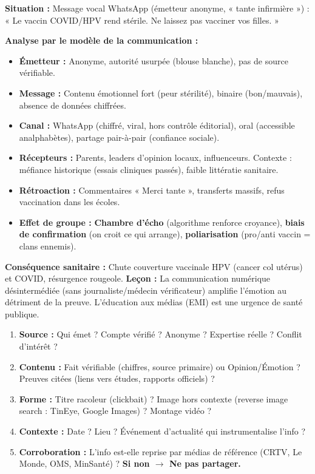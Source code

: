 \documentclass[11pt]{article}
\begin{document}
\begin{exemplebox}
\textbf{Situation :} Message vocal WhatsApp (émetteur anonyme, « tante infirmière ») : « Le vaccin COVID/HPV rend stérile. Ne laissez pas vacciner vos filles. »\par
\textbf{Analyse par le modèle de la communication :}
\begin{itemize}
\item \textbf{Émetteur :} Anonyme, autorité usurpée (blouse blanche), pas de source vérifiable.
\item \textbf{Message :} Contenu émotionnel fort (peur stérilité), binaire (bon/mauvais), absence de données chiffrées.
\item \textbf{Canal :} WhatsApp (chiffré, viral, hors contrôle éditorial), oral (accessible analphabètes), partage pair-à-pair (confiance sociale).
\item \textbf{Récepteurs :} Parents, leaders d'opinion locaux, influenceurs. Contexte : méfiance historique (essais cliniques passés), faible littératie sanitaire.
\item \textbf{Rétroaction :} Commentaires « Merci tante », transferts massifs, refus vaccination dans les écoles.
\item \textbf{Effet de groupe :} \textbf{Chambre d'écho} (algorithme renforce croyance), \textbf{biais de confirmation} (on croit ce qui arrange), \textbf{poliarisation} (pro/anti vaccin = clans ennemis).
\end{itemize}
\textbf{Conséquence sanitaire :} Chute couverture vaccinale HPV (cancer col utérus) et COVID, résurgence rougeole.
\textbf{Leçon :} La communication numérique désintermédiée (sans journaliste/médecin vérificateur) amplifie l'émotion au détriment de la preuve. L'éducation aux médias (EMI) est une urgence de santé publique.
\end{exemplebox}

\begin{methode}
\begin{enumerate}
\item \textbf{Source :} Qui émet ? Compte vérifié ? Anonyme ? Expertise réelle ? Conflit d'intérêt ?
\item \textbf{Contenu :} Fait vérifiable (chiffres, source primaire) ou Opinion/Émotion ? Preuves citées (liens vers études, rapports officiels) ?
\item \textbf{Forme :} Titre racoleur (clickbait) ? Image hors contexte (reverse image search : TinEye, Google Images) ? Montage vidéo ?
\item \textbf{Contexte :} Date ? Lieu ? Événement d'actualité qui instrumentalise l'info ?
\item \textbf{Corroboration :} L'info est-elle reprise par médias de référence (CRTV, Le Monde, OMS, MinSanté) ? \textbf{Si non $\to$ Ne pas partager.}
\end{enumerate}
\end{methode}
\end{document}
